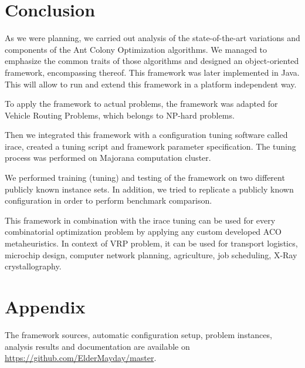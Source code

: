 \documentclass[12pt,a4paper,oneside]{book}
\begin{document}
\chapter{Conclusion}

As we were planning, we carried out analysis of the state-of-the-art variations and components of the Ant Colony Optimization algorithms. We managed to emphasize the common traits of those algorithms and designed an object-oriented framework, encompassing thereof. This framework was later implemented in Java. This will allow to run and extend this framework in a platform independent way.

To apply the framework to actual problems, the framework was adapted for Vehicle Routing Problems, which belongs to NP-hard problems.

Then we integrated this framework with a configuration tuning software called irace, created a tuning script and framework parameter specification. The tuning process was performed on Majorana computation cluster.

We performed training (tuning) and testing of the framework on two different publicly known instance sets. In addition, we tried to replicate a publicly known configuration in order to perform benchmark comparison.

This framework in combination with the irace tuning can be used for every combinatorial optimization problem by applying any custom developed ACO metaheuristics. In context of VRP problem, it can be used for transport logistics, microchip design, computer network planning, agriculture, job scheduling, X-Ray crystallography.



\appendix

\backmatter

\printindex %







\chapter{Appendix}

The framework sources, automatic configuration setup, problem instances, analysis results and documentation are available on \url{https://github.com/ElderMayday/master}.
\end{document}
